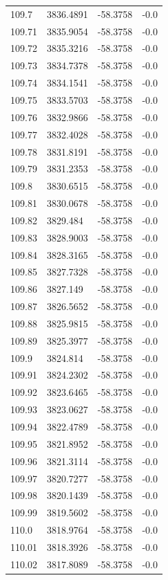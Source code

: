 \begin{table}[H]
\begin{tabular}{llll}
109.7 & 3836.4891 & -58.3758 & -0.0 \\
109.71 & 3835.9054 & -58.3758 & -0.0 \\
109.72 & 3835.3216 & -58.3758 & -0.0 \\
109.73 & 3834.7378 & -58.3758 & -0.0 \\
109.74 & 3834.1541 & -58.3758 & -0.0 \\
109.75 & 3833.5703 & -58.3758 & -0.0 \\
109.76 & 3832.9866 & -58.3758 & -0.0 \\
109.77 & 3832.4028 & -58.3758 & -0.0 \\
109.78 & 3831.8191 & -58.3758 & -0.0 \\
109.79 & 3831.2353 & -58.3758 & -0.0 \\
109.8 & 3830.6515 & -58.3758 & -0.0 \\
109.81 & 3830.0678 & -58.3758 & -0.0 \\
109.82 & 3829.484 & -58.3758 & -0.0 \\
109.83 & 3828.9003 & -58.3758 & -0.0 \\
109.84 & 3828.3165 & -58.3758 & -0.0 \\
109.85 & 3827.7328 & -58.3758 & -0.0 \\
109.86 & 3827.149 & -58.3758 & -0.0 \\
109.87 & 3826.5652 & -58.3758 & -0.0 \\
109.88 & 3825.9815 & -58.3758 & -0.0 \\
109.89 & 3825.3977 & -58.3758 & -0.0 \\
109.9 & 3824.814 & -58.3758 & -0.0 \\
109.91 & 3824.2302 & -58.3758 & -0.0 \\
109.92 & 3823.6465 & -58.3758 & -0.0 \\
109.93 & 3823.0627 & -58.3758 & -0.0 \\
109.94 & 3822.4789 & -58.3758 & -0.0 \\
109.95 & 3821.8952 & -58.3758 & -0.0 \\
109.96 & 3821.3114 & -58.3758 & -0.0 \\
109.97 & 3820.7277 & -58.3758 & -0.0 \\
109.98 & 3820.1439 & -58.3758 & -0.0 \\
109.99 & 3819.5602 & -58.3758 & -0.0 \\
110.0 & 3818.9764 & -58.3758 & -0.0 \\
110.01 & 3818.3926 & -58.3758 & -0.0 \\
110.02 & 3817.8089 & -58.3758 & -0.0 \\

\end{tabular}
\end{table}
